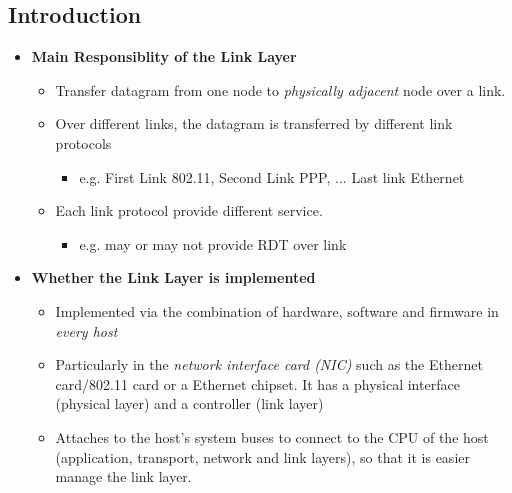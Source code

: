 \documentclass[a4paper]{article}
\begin{document}
\subsection{Introduction}
\begin{itemize}
    \item \textbf{Main Responsiblity of the Link Layer}
    \begin{itemize}[label=$\circ$]
        \item Transfer datagram from one node to \textit{physically adjacent} node over a link.
        \item Over different links, the datagram is transferred by different link protocols
        \begin{itemize}[label=\tiny$\blacksquare$]
            \item e.g. First Link 802.11, Second Link PPP, ... Last link Ethernet
        \end{itemize}
        \item Each link protocol provide different service.
        \begin{itemize}[label=\tiny$\blacksquare$]
            \item e.g. may or may not provide RDT over link
        \end{itemize}
    \end{itemize}
    \item \textbf{Whether the Link Layer is implemented}
    \begin{itemize}[label=\tiny$\blacksquare$]
        \item Implemented via the combination of hardware, software and firmware in \textit{every host}
        \item Particularly in the \textit{network interface card (NIC)} such as the Ethernet card/802.11 card or a Ethernet chipset. It has a physical interface (physical layer) and a controller (link layer)
        \item Attaches to the host's system buses to connect to the CPU of the host (application, transport, network and link layers), so that it is easier manage the link layer.
    \end{itemize}
\end{itemize}
\end{document}
